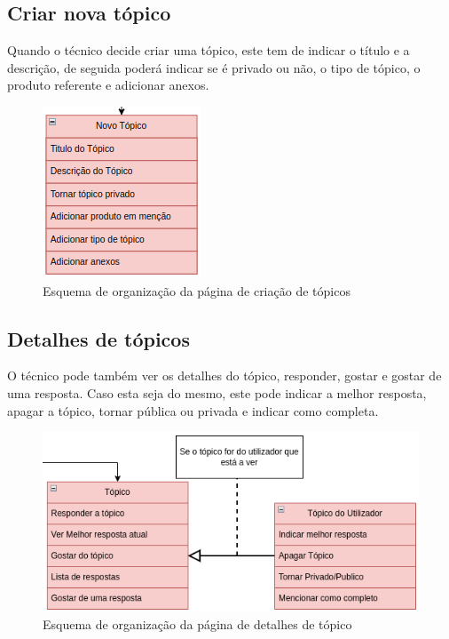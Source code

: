 \subsection{Criar nova tópico}

Quando o técnico decide criar uma tópico, este tem de indicar o título e a descrição, de seguida poderá indicar se é privado ou não, o tipo de tópico, o produto referente e adicionar anexos.

\begin{figure}[htb]
  \centering
  
  \includegraphics[height=0.3\textwidth]{images/Arquiteturas/superficial_de_app/criar_topico.png}
  \caption{Esquema de organização da página de criação de tópicos}
  \label{fig:6}
\end{figure}

\newpage

\subsection{Detalhes de tópicos}

O técnico pode também ver os detalhes do tópico, responder, 
gostar e gostar de uma resposta.
Caso esta seja do mesmo, este pode indicar a melhor resposta, apagar a tópico, tornar pública ou privada e indicar como completa.

\begin{figure}[htb]
  \centering
  
  \includegraphics[height=0.35\textwidth]{images/Arquiteturas/superficial_de_app/detalhes_topico.png}
  \caption{Esquema de organização da página de detalhes de tópico}
  \label{fig:7}
\end{figure}

